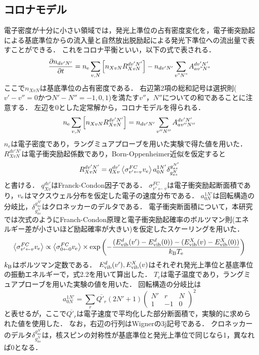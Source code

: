 \subsection{コロナモデル}
電子密度が十分に小さい領域では，発光上準位の占有密度変化を，電子衝突励起による基底準位からの流入量と自然放出脱励起による発光下準位への流出量で表すことができる．
これをコロナ平衡といい，以下の式で表される\cite{PRnoijousei}．
\begin{equation}
    \frac{\partial n_{dv'N'}}{\partial t} = n_{\rm e} \sum_{v, N} \left[ n_{XvN} R^{dv'N'}_{XvN} \right] - n_{dv'N'} \sum_{v"N"} A^{dv'N'}_{av"N"}
\end{equation}
ここで$n_{XvN}$は基底準位の占有密度である．
右辺第2項の総和記号は選択則($v'-v''=0$かつ$N'-N''=-1,0,1$)を満たす$v''，N''$についての和であることに注意する．
左辺を0とした定常解から，コロナモデルを得られる．
\begin{equation}
    n_{\rm e} \sum_{v, N} \left[ n_{XvN} R^{dv'N'}_{XvN} \right] = n_{dv'N'} \sum_{v''N''} A^{dv'N'}_{av''N''}
\end{equation}
$n_e$は電子密度であり，ラングミュアプローブを用いた実験で得た値を用いた\cite{yun}．
$R^{dv'N'}_{XvN}$は電子衝突励起係数であり，Born-Oppenheimer近似を仮定すると
\begin{equation}
    R^{dv'N'}_{XvN} = q^{dv'}_{Xv} \left< \sigma^{FC}_{v' \leftarrow v} v_{\rm e} \right> a^{1N'}_{0N} \delta^{g^{N'}_{as}}_{g^N_{as}}
\end{equation}
と書ける\cite{PRnoijousei}．
$q^{dv'}_{Xv}$はFranck-Condon因子である．
$\sigma^{FC}_{v' \leftarrow v}$は電子衝突励起断面積であり，$v_{\rm e}$はマクスウェル分布を仮定した電子の速度分布である．
$a^{1N'}_{0N}$は回転構造の分岐比，$\delta^{g^{N'}_{as}}_{g^N_{as}}$はクロネッカーのデルタである．
電子衝突断面積について，本研究では次式のようにFranch-Condon原理と電子衝突励起確率のボルツマン則(エネルギー差が小さいほど励起確率が大きい)を仮定したスケーリングを用いた\cite{kyokaisou}．
\begin{equation}
    \left< \sigma^{FC}_{v' \leftarrow v} v_{\rm e} \right> \propto \left< \sigma^{FC}_{0 \leftarrow 0} v_{\rm e} \right> \times \exp \left( -\frac{(E^d_{\rm vib} (v') - E^d_{\rm vib} (0))-(E^X_{\rm vib} (v) - E^X_{\rm vib} (0))}{k_{\rm B} T_{\rm e}} \right)
\end{equation}
$k_{\rm B}$はボルツマン定数である．
$E^d_{\rm vib} (v'), E^X_{\rm vib} (v)$はそれぞれ発光上準位と基底準位の振動エネルギーで，式2.2を用いて算出した．
$T_{e}$は電子温度であり，ラングミュアプローブを用いた実験の値\cite{yun}を用いた．
回転構造の分岐比は
\begin{equation}
    a^{1N'}_{0N} = \sum_r \overline{Q'_{r}} (2N'+1) \left( \begin{array}{ccc} N' & r & N \\ 1 & -1 & 0 \end{array} \right)^2
\end{equation}
と表せる\cite{kyokaisou}が，ここで$\overline{Q'_{r}}$は電子速度で平均化した部分断面積で，実験的に求められた値\cite{senkusya}を使用した．
なお，右辺の行列はWignerの3j記号である．
クロネッカーのデルタ$\delta^{g^{N'}_{as}}_{g^N_{as}}$は，核スピンの対称性が基底準位と発光上準位で同じなら1，異なれば0となる．

